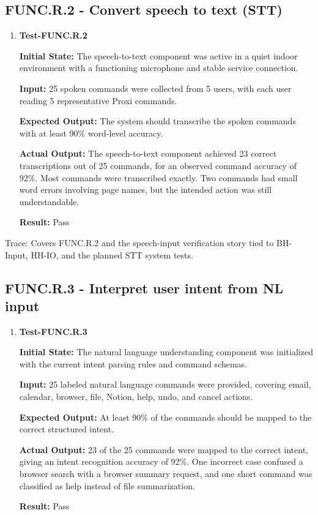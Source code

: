 \documentclass[12pt]{article}
\begin{document}
\subsection{FUNC.R.2 - Convert speech to text (STT)}

\begin{enumerate}
    \item \textbf{Test-FUNC.R.2}
    
    \textbf{Initial State:} The speech-to-text component was active in
    a quiet indoor environment with a functioning microphone and stable
    service connection.
    
    \textbf{Input:} 25 spoken commands were collected from 5 users,
    with each user reading 5 representative Proxi commands.
    
    \textbf{Expected Output:} The system should transcribe the spoken
    commands with at least 90\% word-level accuracy.
    
    \textbf{Actual Output:} The speech-to-text component achieved 23
    correct transcriptions out of 25 commands, for an observed command
    accuracy of 92\%. Most commands were transcribed exactly. Two
    commands had small word errors involving page names, but the
    intended action was still understandable.
    
    \textbf{Result:} Pass
\end{enumerate}

\noindent Trace: Covers FUNC.R.2 and the speech-input verification story tied to
BH-Input, HH-IO, and the planned STT system tests.


\subsection{FUNC.R.3 - Interpret user intent from NL input}

\begin{enumerate}
    \item \textbf{Test-FUNC.R.3}
    
    \textbf{Initial State:} The natural language understanding
    component was initialized with the current intent parsing rules and
    command schemas.
    
    \textbf{Input:} 25 labeled natural language commands were
    provided, covering email, calendar, browser, file, Notion, help,
    undo, and cancel actions.
    
    \textbf{Expected Output:} At least 90\% of the commands should be
    mapped to the correct structured intent.
    
    \textbf{Actual Output:} 23 of the 25 commands were mapped to the
    correct intent, giving an intent recognition accuracy of 92\%. One
    incorrect case confused a browser search with a browser summary
    request, and one short command was classified as help instead of
    file summarization.
    
    \textbf{Result:} Pass
\end{enumerate}
\end{document}
